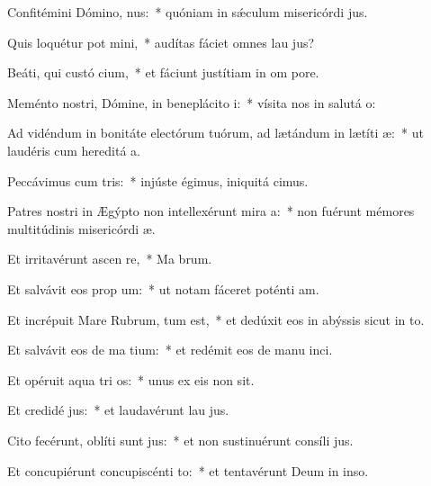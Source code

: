\item Confitémini Dómino,  nus:~* quóniam in sǽculum misericórdi jus.
\item Quis loquétur pot mini,~* audítas fáciet omnes lau jus?
\item Beáti, qui custó cium,~* et fáciunt justítiam in om pore.
\item Meménto nostri, Dómine, in beneplácito  i:~* vísita nos in salutá o:
\item Ad vidéndum in bonitáte electórum tuórum, ad lætándum in lætíti  æ:~* ut laudéris cum hereditá a.
\item Peccávimus cum  tris:~* injúste égimus, iniquitá cimus.
\item Patres nostri in Ægýpto non intellexérunt mira a:~* non fuérunt mémores multitúdinis misericórdi æ.
\item Et irritavérunt ascen  re,~* Ma brum.
\item Et salvávit eos prop  um:~* ut notam fáceret poténti am.
\item Et incrépuit Mare Rubrum,  tum est,~* et dedúxit eos in abýssis sicut in to.
\item Et salvávit eos de ma tium:~* et redémit eos de manu inci.
\item Et opéruit aqua tri os:~* unus ex eis non sit.
\item Et credidé  jus:~* et laudavérunt lau jus.
\item Cito fecérunt, oblíti sunt  jus:~* et non sustinuérunt consíli jus.
\item Et concupiérunt concupiscénti  to:~* et tentavérunt Deum in inso.

